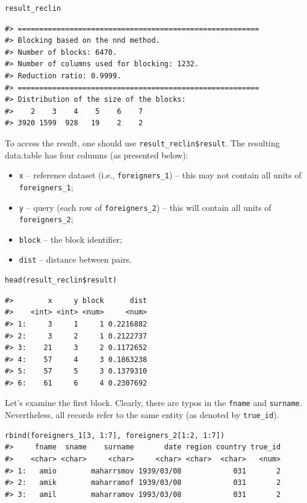 \begin{verbatim}
result_reclin
\end{verbatim}

\begin{verbatim}
#> ========================================================
#> Blocking based on the nnd method.
#> Number of blocks: 6470.
#> Number of columns used for blocking: 1232.
#> Reduction ratio: 0.9999.
#> ========================================================
#> Distribution of the size of the blocks:
#>    2    3    4    5    6    7 
#> 3920 1599  928   19    2    2
\end{verbatim}

To access the result, one should use \texttt{result\_reclin\$result}. The
resulting data.table has four columns (as presented below):

\begin{itemize}
\tightlist
\item
  \texttt{x} -- reference dataset (i.e., \texttt{foreigners\_1}) -- this may not
  contain all units of \texttt{foreigners\_1};
\item
  \texttt{y} -- query (each row of \texttt{foreigners\_2}) -- this will contain all
  units of \texttt{foreigners\_2};
\item
  \texttt{block} -- the block identifier;
\item
  \texttt{dist} -- distance between pairs.
\end{itemize}


\begin{verbatim}
head(result_reclin$result)
\end{verbatim}

\begin{verbatim}
#>        x     y block      dist
#>    <int> <int> <num>     <num>
#> 1:     3     1     1 0.2216882
#> 2:     3     2     1 0.2122737
#> 3:    21     3     2 0.1172652
#> 4:    57     4     3 0.1863238
#> 5:    57     5     3 0.1379310
#> 6:    61     6     4 0.2307692
\end{verbatim}

Let's examine the first block. Clearly, there are typos in the \texttt{fname}
and \texttt{surname}. Nevertheless, all records refer to the same entity (as
denoted by \texttt{true\_id}).


\begin{verbatim}
rbind(foreigners_1[3, 1:7], foreigners_2[1:2, 1:7])
#>     fname  sname    surname       date region country true_id
#>    <char> <char>     <char>     <char> <char>  <char>   <num>
#> 1:   amio        maharrsmov 1939/03/08            031       2
#> 2:   amik        maharramof 1939/03/08            031       2
#> 3:   amil        maharramov 1993/03/08            031       2
\end{verbatim}

